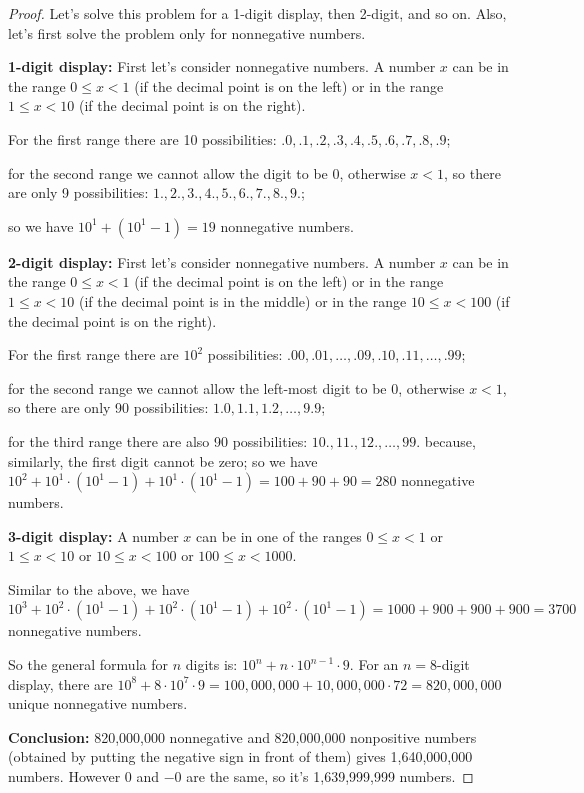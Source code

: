 \documentclass[14pt]{extarticle}
\begin{document}
\begin{proof}
Let's solve this problem for a 1-digit display, then 2-digit, and so on. Also, let's first solve the problem only
for nonnegative numbers.

{\bf 1-digit display:} First let's consider nonnegative numbers. A number $x$ can be in the range \(0 \leq x < 1\)
(if the decimal point is on the left) or in the range \(1 \leq x < 10\) (if the decimal point is on the right).

For the first range there are 10 possibilities: \(.0, .1, .2, .3, .4, .5, .6, .7, .8, .9\);

for the second range we cannot allow the digit to be 0, otherwise \(x < 1\), so there are only 9 possibilities: 
\(1., 2., 3., 4., 5., 6., 7., 8., 9.\);

so we have \(10^1 + (10^1 - 1) = 19\) nonnegative numbers.

{\bf 2-digit display:} First let's consider nonnegative numbers. A number $x$ can be in the range \(0 \leq x < 1\)
(if the decimal point is on the left) or in the range \(1 \leq x < 10\) (if the decimal point is in the middle) or in 
the range \(10 \leq x < 100\) (if the decimal point is on the right).

For the first range there are \(10^2\) possibilities: \(.00, .01, \ldots, .09, .10, .11, \ldots, .99\); 

for the second range we cannot allow the left-most digit to be 0, otherwise \(x < 1\), so there are only 90 
possibilities: \(1.0, 1.1, 1.2, \ldots, 9.9\);

for the third range there are also 90 possibilities: \(10., 11., 12., \ldots, 99.\) because, similarly, the first digit 
cannot be zero; so we have \(10^2 + 10^1 \cdot (10^1 - 1) + 10^1 \cdot (10^1 - 1) = 100 + 90 + 90 = 280\) nonnegative 
numbers.

{\bf 3-digit display:} A number $x$ can be in one of the ranges \(0 \leq x < 1\) or \(1 \leq x < 10\) or \(10 \leq x 
< 100\) or \(100 \leq x < 1000\).

Similar to the above, we have \(10^3 + 10^2 \cdot (10^1 - 1) + 10^2 \cdot (10^1 - 1) + 10^2 \cdot (10^1 - 1) = 
1000 + 900 + 900 + 900 = 3700\) nonnegative numbers.

So the general formula for $n$ digits is: \(10^n + n \cdot 10^{n-1} \cdot 9\). For an $n=8$-digit display, there are
\(10^8 + 8 \cdot 10^7 \cdot 9 = 100,000,000 + 10,000,000 \cdot 72 = 820,000,000\) unique nonnegative numbers.

{\bf Conclusion:} 820,000,000 nonnegative and 820,000,000 nonpositive numbers (obtained by putting the negative sign
in front of them) gives 1,640,000,000 numbers. However 0 and \(-0\) are the same, so it's 1,639,999,999 numbers.
\end{proof}
\end{document}
